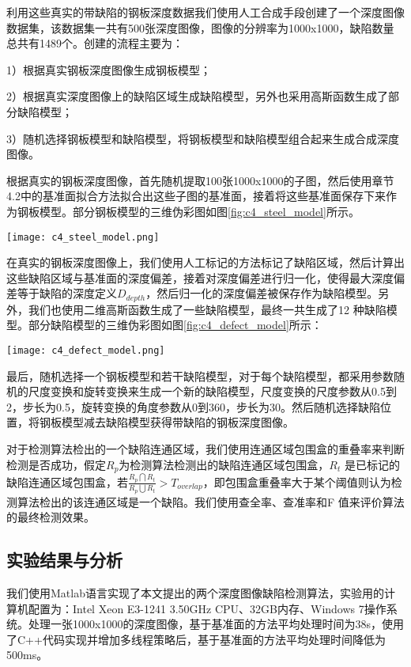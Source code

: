         利用这些真实的带缺陷的钢板深度数据我们使用人工合成手段创建了一个深度图像数据集，该数据集一共有500张深度图像，图像的分辨率为1000x1000，缺陷数量总共有1489个。创建的流程主要为：

        1）根据真实钢板深度图像生成钢板模型；

        2）根据真实深度图像上的缺陷区域生成缺陷模型，另外也采用高斯函数生成了部分缺陷模型；

        3）随机选择钢板模型和缺陷模型，将钢板模型和缺陷模型组合起来生成合成深度图像。

        根据真实的钢板深度图像，首先随机提取100张1000x1000的子图，然后使用章节4.2中的基准面拟合方法拟合出这些子图的基准面，接着将这些基准面保存下来作为钢板模型。部分钢板模型的三维伪彩图如图\ref{fig:c4_steel_model}所示。

        \begin{figure*}[!h]
        \centering
        \texttt{[image: c4\_steel\_model.png]}
        \caption{部分钢板模型三维伪彩图}
        \label{fig:c4_steel_model}
        \end{figure*}

        在真实的钢板深度图像上，我们使用人工标记的方法标记了缺陷区域，然后计算出这些缺陷区域与基准面的深度偏差，接着对深度偏差进行归一化，使得最大深度偏差等于缺陷的深度定义$D_{depth}$，然后归一化的深度偏差被保存作为缺陷模型。另外，我们也使用二维高斯函数生成了一些缺陷模型，最终一共生成了12 种缺陷模型。部分缺陷模型的三维伪彩图如图\ref{fig:c4_defect_model}所示：

        \begin{figure*}[!h]
        \centering
        \texttt{[image: c4\_defect\_model.png]}
        \caption{部分缺陷模型三维伪彩图}
        \label{fig:c4_defect_model}
        \end{figure*}

        最后，随机选择一个钢板模型和若干缺陷模型，对于每个缺陷模型，都采用参数随机的尺度变换和旋转变换来生成一个新的缺陷模型，尺度变换的尺度参数从0.5到2，步长为0.5，旋转变换的角度参数从0到360，步长为30。然后随机选择缺陷位置，将钢板模型减去缺陷模型获得带缺陷的钢板深度图像。

        对于检测算法检出的一个缺陷连通区域，我们使用连通区域包围盒的重叠率来判断检测是否成功，假定$R_p$为检测算法检测出的缺陷连通区域包围盒，$R_t$ 是已标记的缺陷连通区域包围盒，若$\frac{{R_p}\bigcap{R_t}}{{R_p}\bigcup{R_t}}>T_{overlap}$，即包围盒重叠率大于某个阈值则认为检测算法检出的该连通区域是一个缺陷。我们使用查全率、查准率和F 值来评价算法的最终检测效果。
        \subsection{实验结果与分析}
        我们使用Matlab语言实现了本文提出的两个深度图像缺陷检测算法，实验用的计算机配置为：Intel Xeon E3-1241 3.50GHz CPU、32GB内存、Windows 7操作系统。处理一张1000x1000的深度图像，基于基准面的方法平均处理时间为38s，使用了C++代码实现并增加多线程策略后，基于基准面的方法平均处理时间降低为500ms。

